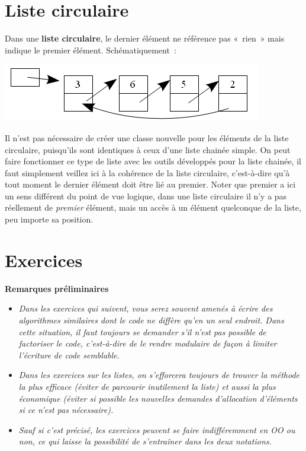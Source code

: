 \section{Liste circulaire}

	Dans une \textbf{liste circulaire}, le dernier élément ne référence 
	pas «~rien~» mais indique le premier élément.
	Schématiquement~:

	\begin{center}
	\includegraphics[width=11.351cm,height=2.54cm]{image/a2012Logique2eme-img009.png}
	\end{center}
	
	Il n'est pas nécessaire de créer une classe nouvelle pour les 
	éléments de la liste circulaire, puisqu'ils sont
	identiques à ceux d'une liste chainée simple. On peut faire fonctionner 
	ce type de liste avec les outils développés
	pour la liste chainée, il faut simplement veillez ici à la cohérence 
	de la liste circulaire, c'est-à-dire qu'à tout
	moment le dernier élément doit être lié au premier. Noter que premier 
	a ici un sens différent du point de vue logique,
	dans une liste circulaire il n'y a pas réellement de \textit{premier} 
	élément, mais un accès à un élément quelconque de
	la liste, peu importe sa position.
	
	
\section{Exercices}

	{\bfseries
	Remarques préliminaires}

	\begin{itemize}
		\item 
			\textit{Dans les exercices qui suivent, vous serez souvent amenés à 
			écrire des algorithmes similaires dont le code ne diffère
			qu'en un seul endroit. Dans cette situation, il faut toujours se 
			demander s'il n'est pas possible de factoriser le
			code, c'est-à-dire de le rendre modulaire de façon à limiter 
			l'écriture de code semblable.}
		\item
			\textit{Dans les exercices sur les listes, on s'efforcera toujours 
			de trouver la méthode la plus efficace (éviter de parcourir
			inutilement la liste) et aussi la plus économique (éviter si possible 
			les nouvelles demandes d'allocation d'éléments si
			ce n'est pas nécessaire).}
		\item 
			\textit{Sauf si c'est précisé, les exercices peuvent se faire 
			indifféremment en OO ou non, ce qui laisse la possibilité de
			s'entraîner dans les deux notations.}
	\end{itemize}
	
